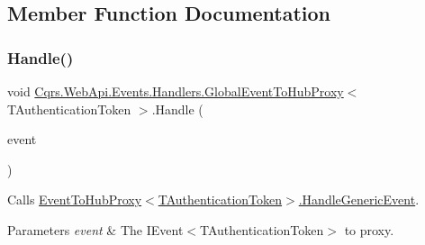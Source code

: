 \subsection{Member Function Documentation}
\mbox{\label{classCqrs_1_1WebApi_1_1Events_1_1Handlers_1_1GlobalEventToHubProxy_a80deae2ad156cccae069e9cf7b0cd6aa_a80deae2ad156cccae069e9cf7b0cd6aa}} 
\subsubsection{\texorpdfstring{Handle()}{Handle()}}
{\footnotesize\ttfamily void \hyperlink{classCqrs_1_1WebApi_1_1Events_1_1Handlers_1_1GlobalEventToHubProxy}{Cqrs.\+Web\+Api.\+Events.\+Handlers.\+Global\+Event\+To\+Hub\+Proxy}$<$ T\+Authentication\+Token $>$.Handle (\begin{DoxyParamCaption}\item[{\hyperlink{interfaceCqrs_1_1Events_1_1IEvent}{I\+Event}$<$ T\+Authentication\+Token $>$ @}]{event }\end{DoxyParamCaption})}



Calls \hyperlink{classCqrs_1_1WebApi_1_1Events_1_1Handlers_1_1EventToHubProxy_a310fc8d40bfbe514406716150f30b74d_a310fc8d40bfbe514406716150f30b74d}{Event\+To\+Hub\+Proxy$<$\+T\+Authentication\+Token$>$.\+Handle\+Generic\+Event}. 


\begin{DoxyParams}{Parameters}
{\em event} & The I\+Event$<$\+T\+Authentication\+Token$>$ to proxy.\\
\hline
\end{DoxyParams}
